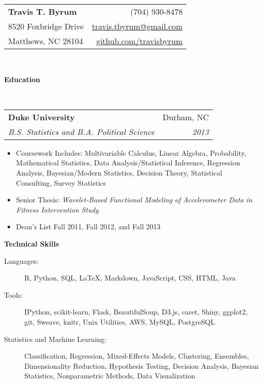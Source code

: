 \documentclass[letterpaper,12pt]{article}
\makeatletter
\newcommand{\resitem}[1]{\item #1 \vspace{-2pt}}
\newcommand{\resheading}[1]{{\large \colorbox{mygrey}{\begin{minipage}{\textwidth}{\textbf{#1 \vphantom{p\^{E}}}}\end{minipage}}}}
\newcommand{\ressubheading}[4]{
\begin{tabular*}{6.9in}{l@{\extracolsep{\fill}}r}
		\textbf{#1} & #2 \\
		\textit{#3} & \textit{#4} \\
\end{tabular*}\vspace{-6pt}}
\makeatother
\begin{document}
\newcommand{\mywebheader}{
\begin{tabular*}
	{7in}
	{l@{\extracolsep{\fill}}r}
		\textbf{\Huge Travis T. Byrum}  & (704) 930-8478\\
		8520 Foxbridge Drive & \href{mailto:travis.tbyrum@gmail.com}{travis.tbyrum@gmail.com} \\
		Matthews, NC 28104 & \href{https://github.com/travisbyrum}{github.com/travisbyrum}\\
\end{tabular*}
\\
\vspace{0.1in}}

\mywebheader
\resheading{Education}
\\
\ressubheading
  {Duke University}
  {Durham, NC}
  {B.S. Statistics and B.A. Political Science}
  {2013}
  {
	  \footnotesize
		  \begin{itemize}
			  \resitem{Coursework Includes: Multivariable Calculus, Linear Algebra, Probability, Mathematical Statistics, Data Analysis/Statistical Inference, 
			  Regression Analysis, Bayesian/Modern Statistics, Decision Theory, Statistical Consulting, Survey Statistics}
			  \resitem{Senior Thesis: \textit{Wavelet-Based Functional Modeling of Accelerometer Data in Fitness Intervention Study}} 
			  \resitem{Dean's List Fall 2011, Fall 2012, and Fall 2013} 
		  \end{itemize}

\resheading
  {Technical Skills}
	\begin{description}
		\item[Languages:]{\footnotesize R, Python, SQL, \LaTeX, Markdown, JavaScript, CSS, HTML, Java}
		\item[Tools:]{\footnotesize IPython, scikit-learn, Flask, BeautifulSoup, D3.js, caret, Shiny, ggplot2, git, Sweave, knitr, Unix Utilities, AWS, MySQL, PostgreSQL}
		\item[Statistics and Machine Learning:]{\footnotesize Classification, Regression, Mixed-Effects Models, Clustering, Ensembles,
        Dimensionality Reduction, Hypothesis Testing, Decision Analysis, Bayesian Statistics, Nonparametric Methods, Data Visualization}
	\end{description}

}
\end{document}
